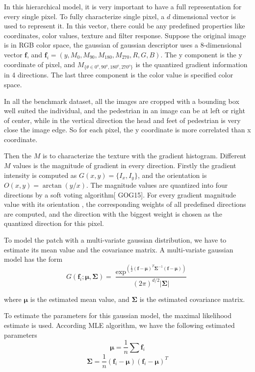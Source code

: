 In this hierarchical model, it is very important to have a full representation for every single pixel. To fully characterize single pixel, a $d$ dimensional vector is used to represent it. In this vector, there could be any predefined properties like coordinates, color values, texture and filter response. Suppose the original image is in RGB color space, the gaussian of gaussian descriptor uses a 8-dimensional vector $\textbf{f}$, and 
$\bm{f}_i = (y,M_0,M_{90},M_{180},M_{270},R,G,B)$.
The y component is the y coordinate of pixel, and $M_{\{{\theta}\in{0^o,90^o,180^o,270^o}\}}$ is the quantized gradient information in 4 directions. The last three component is the color value is specified color space.

In all the benchmark dataset, all the images are cropped with a bounding box well suited the individual, and the pedestrian in an image can be at left or right of center, while in the vertical direction the head and feet of pedestrian is very close the image edge. So for each pixel, the y coordinate is more correlated than x coordinate. 

Then the $M$ is to characterize the texture with the gradient histogram. Different $M$ values is the magnitude of gradient in every direction. Firstly the gradient intensity is computed as $G(x,y) = \{I_x,I_y\}$, and the orientation is $O(x, y) = \arctan(y/x)$. The magnitude values are quantized into four directions by a soft voting algorithm[ GOG15]. For every gradient magnitude value with its orientation , the corresponding weights of all predefined directions are computed, and the direction with the biggest weight is chosen as the quantized direction for this pixel.

To model the patch with a multi-variate gaussian distribution, we have to estimate its mean value and the covariance matrix. A multi-variate gaussian model has the form
\begin{equation}
G(\bm{f}_i;\bm{\mu},\bm{\Sigma}) = \frac{\exp^{(\frac{1}{2}(\bm{f}-\bm{\mu})^T\bm{\Sigma}^{-1}(\bm{f}-\bm{\mu}))}}{(2\pi)^{d/2}|{\bm{\Sigma|}}} 
\end{equation}

where $\bm {\mu}$ is the estimated mean value, and $\bm {\Sigma} $ is the estimated covariance matrix. 

To estimate the parameters for this gaussian model, the maximal likelihood estimate is used. According MLE algorithm, we have the following estimated parameters
\begin{equation}
\bm{\mu} = \frac{1}{n}\sum \bm{f}_i 
\end{equation}
\begin{equation}
\bm{\Sigma} = \frac{1}{n} (\bm{f}_i-\bm{\mu})(\bm{f}_i-\bm{\mu})^T
\end{equation}


